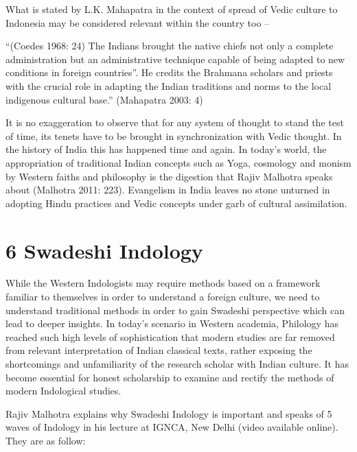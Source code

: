 What is stated by L.K. Mahapatra in the context of spread of Vedic culture to Indonesia may be considered relevant within the country too –

\begin{myquote}
“(Coedes 1968: 24) The Indians brought the native chiefs not only a complete administration but an administrative technique capable of being adapted to new conditions in foreign countries”. He credits the Brahmana scholars and priests with the crucial role in adapting the Indian traditions and norms to the local indigenous cultural base.” (Mahapatra 2003: 4)
\end{myquote}

It is no exaggeration to observe that for any system of thought to stand the test of time, its tenets have to be brought in synchronization with Vedic thought. In the history of India this has happened time and again. In today's world, the appropriation of traditional Indian concepts such as Yoga, cosmology and monism by Western faiths and philosophy is the digestion that Rajiv Malhotra speaks about (Malhotra 2011: 223). Evangelism in India leaves no stone unturned in adopting Hindu practices and Vedic concepts under garb of cultural assimilation.


\section*{6 Swadeshi Indology}

While the Western Indologists may require methods based on a framework familiar to themselves in order to understand a foreign culture, we need to understand traditional methods in order to gain Swadeshi perspective which can lead to deeper insights. In today’s scenario in Western academia, Philology has reached such high levels of sophistication that modern studies are far removed from relevant interpretation of Indian classical texts, rather exposing the shortcomings and unfamiliarity of the research scholar with Indian culture. It has become essential for honest scholarship to examine and rectify the methods of modern Indological studies.

Rajiv Malhotra explains why Swadeshi Indology is important and speaks of 5 waves of Indology in his lecture at IGNCA, New Delhi (video available online). They are as follow:

